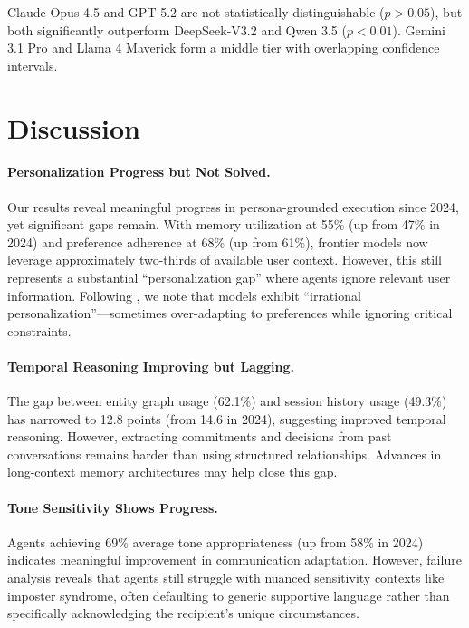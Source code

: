 \documentclass{article}
\begin{document}
Claude Opus 4.5 and GPT-5.2 are not statistically distinguishable ($p > 0.05$), but both significantly outperform DeepSeek-V3.2 and Qwen 3.5 ($p < 0.01$). Gemini 3.1 Pro and Llama 4 Maverick form a middle tier with overlapping confidence intervals.

\section{Discussion}
\label{sec:discussion}

\paragraph{Personalization Progress but Not Solved.} Our results reveal meaningful progress in persona-grounded execution since 2024, yet significant gaps remain. With memory utilization at 55\% (up from 47\% in 2024) and preference adherence at 68\% (up from 61\%), frontier models now leverage approximately two-thirds of available user context. However, this still represents a substantial ``personalization gap'' where agents ignore relevant user information. Following \citet{rpeval2026}, we note that models exhibit ``irrational personalization''---sometimes over-adapting to preferences while ignoring critical constraints.

\paragraph{Temporal Reasoning Improving but Lagging.} The gap between entity graph usage (62.1\%) and session history usage (49.3\%) has narrowed to 12.8 points (from 14.6 in 2024), suggesting improved temporal reasoning. However, extracting commitments and decisions from past conversations remains harder than using structured relationships. Advances in long-context memory architectures \citep{memgpt2023,amemgym2026} may help close this gap.

\paragraph{Tone Sensitivity Shows Progress.} Agents achieving 69\% average tone appropriateness (up from 58\% in 2024) indicates meaningful improvement in communication adaptation. However, failure analysis reveals that agents still struggle with nuanced sensitivity contexts like imposter syndrome, often defaulting to generic supportive language rather than specifically acknowledging the recipient's unique circumstances.
\end{document}
